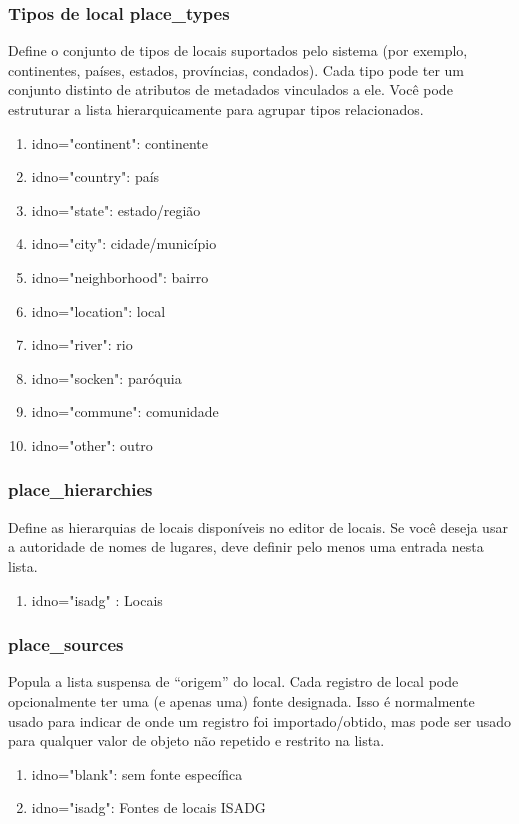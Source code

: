 \subsubsection{Tipos de local place\_types}
Define o conjunto de tipos de locais suportados pelo sistema (por exemplo, continentes, países, estados, províncias, condados). Cada tipo pode ter um conjunto distinto de atributos de metadados vinculados a ele. Você pode estruturar a lista hierarquicamente para agrupar tipos relacionados.
\begin{enumerate}
	\item idno="continent": continente
	\item idno="country": país
	\item idno="state": estado/região
	\item idno="city": cidade/município
	\item idno="neighborhood": bairro
	\item idno="location": local
	\item idno="river": rio
	\item idno="socken": paróquia
	\item idno="commune": comunidade
	\item idno="other": outro
\end{enumerate}

\subsubsection{place\_hierarchies}
Define as hierarquias de locais disponíveis no editor de locais. Se você deseja usar a autoridade de nomes de lugares, deve definir pelo menos uma entrada nesta lista.
\begin{enumerate}
	\item idno="isadg" : Locais
\end{enumerate}

\subsubsection{place\_sources}
Popula a lista suspensa de ``origem'' do local. Cada registro de local pode opcionalmente ter uma (e apenas uma) fonte designada. Isso é normalmente usado para indicar de onde um registro foi importado/obtido, mas pode ser usado para qualquer valor de objeto não repetido e restrito na lista.
\begin{enumerate}
	\item idno="blank": sem fonte específica\\
	\item idno="isadg": Fontes de locais ISADG
\end{enumerate}

